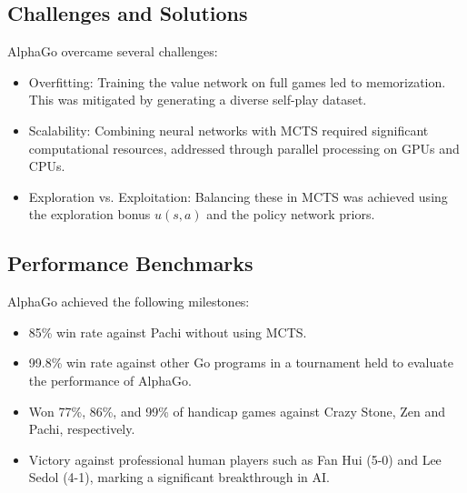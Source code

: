 \subsection{Challenges and Solutions}
AlphaGo overcame several challenges:
\begin{itemize}
    \item Overfitting: Training the value network on full games led to memorization. This
          was mitigated by generating a diverse self-play dataset.
    \item Scalability: Combining neural networks with MCTS required significant
          computational resources, addressed through parallel processing on GPUs and
          CPUs.
    \item Exploration vs. Exploitation: Balancing these in MCTS was achieved using the
          exploration bonus \( u(s, a) \) and the policy network priors.
\end{itemize}

\subsection{Performance Benchmarks}
AlphaGo achieved the following milestones:
\begin{itemize}
    \item 85\% win rate against Pachi without using MCTS.
    \item 99.8\% win rate against other Go programs in a tournament held to evaluate the performance of AlphaGo.
    \item Won 77\%, 86\%, and 99\% of handicap games against Crazy Stone, Zen and Pachi,
          respectively.
    \item Victory against professional human players such as Fan Hui (5-0) and Lee Sedol
          (4-1), marking a significant breakthrough in AI.
\end{itemize}